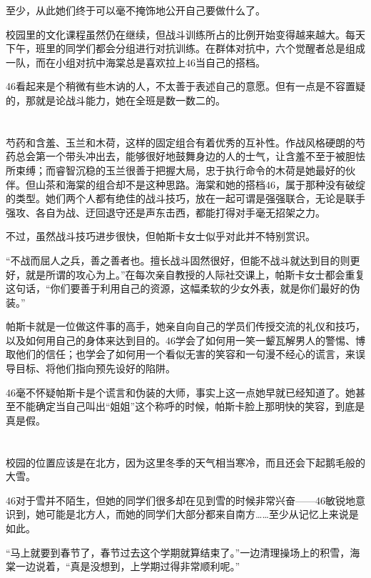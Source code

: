 至少，从此她们终于可以毫不掩饰地公开自己要做什么了。

校园里的文化课程虽然仍在继续，但战斗训练所占的比例开始变得越来越大。每天下午，班里的同学们都会分组进行对抗训练。在群体对抗中，六个觉醒者总是组成一队，而在小组对抗中海棠总是喜欢拉上46当自己的搭档。

46看起来是个稍微有些木讷的人，不太善于表述自己的意愿。但有一点是不容置疑的，那就是论战斗能力，她在全班是数一数二的。

\section*{}

芍药和含羞、玉兰和木荷，这样的固定组合有着优秀的互补性。作战风格硬朗的芍药总会第一个带头冲出去，能够很好地鼓舞身边的人的士气，让含羞不至于被胆怯所束缚；而睿智沉稳的玉兰很善于把握大局，忠于执行命令的木荷是她最好的伙伴。但山茶和海棠的组合却不是这种思路。海棠和她的搭档46，属于那种没有破绽的类型。她们两个人都有绝佳的战斗技巧，放在一起可谓是强强联合，无论是联手强攻、各自为战、迂回退守还是声东击西，都能打得对手毫无招架之力。

不过，虽然战斗技巧进步很快，但帕斯卡女士似乎对此并不特别赏识。

“不战而屈人之兵，善之善者也。擅长战斗固然很好，但能不战斗就达到目的则更好，就是所谓的攻心为上。”在每次亲自教授的人际社交课上，帕斯卡女士都会重复这句话，“你们要善于利用自己的资源，这幅柔软的少女外表，就是你们最好的伪装。”

帕斯卡就是一位做这件事的高手，她亲自向自己的学员们传授交流的礼仪和技巧，以及如何用自己的身体来达到目的。46学会了如何用一笑一颦瓦解男人的警惕、博取他们的信任；也学会了如何用一个看似无害的笑容和一句漫不经心的谎言，来误导目标、将他们指向预先设好的陷阱。

46毫不怀疑帕斯卡是个谎言和伪装的大师，事实上这一点她早就已经知道了。她甚至不能确定当自己叫出“姐姐”这个称呼的时候，帕斯卡脸上那明快的笑容，到底是真是假。

\section*{}

校园的位置应该是在北方，因为这里冬季的天气相当寒冷，而且还会下起鹅毛般的大雪。

46对于雪并不陌生，但她的同学们很多却在见到雪的时候非常兴奋——46敏锐地意识到，她可能是北方人，而她的同学们大部分都来自南方……至少从记忆上来说是如此。

“马上就要到春节了，春节过去这个学期就算结束了。”一边清理操场上的积雪，海棠一边说着，“真是没想到，上学期过得非常顺利呢。”

